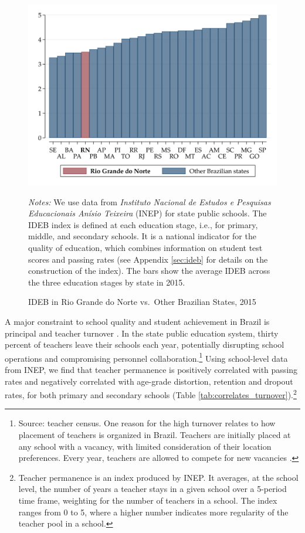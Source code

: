 \documentclass[11pt,a4paper]{article}
\begin{document}
\begin{figure}[ht!]
    \caption{IDEB in Rio Grande do Norte vs.\ Other Brazilian States, 2015}
    \label{fig:IDEB_byState}
    \centering
    \includegraphics[width=13cm]{DataWork/Output/Figures/fig2-IDEB_byState.png}
    \begin{minipage}{0.835\textwidth}
        \small{\textit{Notes:} We use data from \textit{Instituto Nacional de Estudos e Pesquisas Educacionais Anísio Teixeira} (INEP) for state public schools. The IDEB index is defined at each education stage, i.e., for primary, middle, and secondary schools. It is a national indicator for the quality of education, which combines information on student test scores and passing rates (see Appendix \ref{sec:ideb} for details on the construction of the index). The bars show the average IDEB across the three education stages by state in 2015.}
    \end{minipage}
\end{figure}

A major constraint to school quality and student achievement in Brazil is principal and teacher turnover \citep{akhtari2018political}. In the state public education system, thirty percent of teachers leave their schools each year, potentially disrupting school operations and compromising personnel collaboration.\footnote{Source: teacher census. One reason for the high turnover relates to how placement of teachers is organized in Brazil. Teachers are initially placed at any school with a vacancy, with limited consideration of their location preferences. Every year, teachers are allowed to compete for new vacancies \citep{akhtari2018political}.} Using school-level data from INEP, we find that teacher permanence is positively correlated with passing rates and negatively correlated with age-grade distortion, retention and dropout rates, for both primary and secondary schools (Table \ref{tab:correlates_turnover}).\footnote{Teacher permanence is an index produced by INEP. It averages, at the school level, the number of years a teacher stays in a given school over a 5-period time frame, weighting for the number of teachers in a school. The index ranges from 0 to 5, where a higher number indicates more regularity of the teacher pool in a school.}
\end{document}
